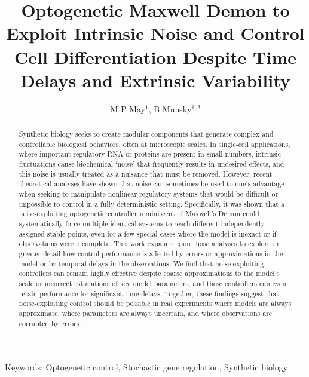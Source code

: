 \documentclass[12pt]{article}
\begin{document}
\title{Optogenetic Maxwell Demon to Exploit Intrinsic Noise and Control Cell Differentiation Despite Time Delays and Extrinsic Variability}
\maketitle

\author{M P May$^1$, B Munsky$^{1,2}$}



\begin{abstract}
Synthetic biology seeks to create modular components that generate complex and controllable biological behaviors, often at microscopic scales. In single-cell applications, where important regulatory RNA or proteins are present in small numbers, intrinsic fluctuations cause biochemical `noise' that frequently results in undesired effects, and this noise is usually treated as a nuisance that must be removed. However, recent theoretical analyses have shown that noise can sometimes be used to one's advantage when seeking to manipulate nonlinear regulatory systems that would be difficult or impossible to control in a fully deterministic setting. Specifically, it was shown that a noise-exploiting optogenetic controller reminiscent of Maxwell's Demon could systematically force multiple identical systems to reach different independently-assigned stable points, even for a few special cases where the model is inexact or if observations were incomplete. This work expands upon those analyses to explore in greater detail how control performance is affected by errors or approximations in the model or by temporal delays in the observations. We find that noise-exploiting controllers can remain highly effective despite coarse approximations to the model's scale or incorrect estimations of key model parameters, and these controllers can even retain performance for significant time delays.  Together, these findings suggest that noise-exploiting control should be possible in real experiments where models are always approximate, where parameters are always uncertain, and where observations are corrupted by errors.

\end{abstract}
Keywords: Optogenetic control, Stochastic gene regulation, Synthetic biology
\end{document}
